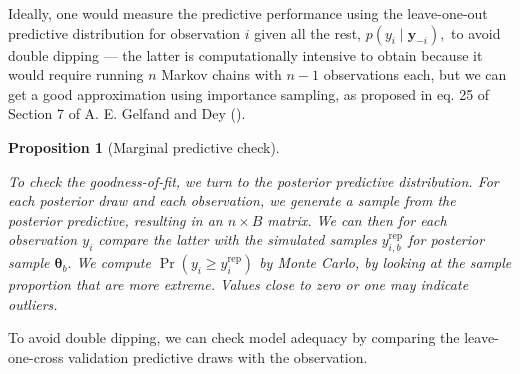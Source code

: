 \documentclass[
  11pt,
  letterpaper,
]{scrbook}
\theoremstyle{plain}
\theoremstyle{plain}
\newtheorem{proposition}{Proposition}[chapter]
\theoremstyle{definition}
\theoremstyle{definition}
\theoremstyle{definition}
\theoremstyle{plain}
\theoremstyle{remark}
\begin{document}
Ideally, one would measure the predictive performance using the
leave-one-out predictive distribution for observation \(i\) given all
the rest, \(p(y_i \mid \boldsymbol{y}_{-i}),\) to avoid double dipping
--- the latter is computationally intensive to obtain because it would
require running \(n\) Markov chains with \(n-1\) observations each, but
we can get a good approximation using importance sampling, as proposed
in eq. 25 of Section 7 of A. E. Gelfand and Dey
().

\begin{proposition}[Marginal predictive
check]\protect\hypertarget{prp-marginal-pred-checks}{}\label{prp-marginal-pred-checks}

To check the goodness-of-fit, we turn to the posterior predictive
distribution. For each posterior draw and each observation, we generate
a sample from the posterior predictive, resulting in an \(n \times B\)
matrix. We can then for each observation \(y_i\) compare the latter with
the simulated samples \(y_{i,b}^{\mathrm{rep}}\) for posterior sample
\(\boldsymbol{\theta}_b.\) We compute
\(\Pr(y_i \geq y_{i}^{\mathrm{rep}})\) by Monte Carlo, by looking at the
sample proportion that are more extreme. Values close to zero or one may
indicate outliers.

\end{proposition}

To avoid double dipping, we can check model adequacy by comparing the
leave-one-cross validation predictive draws with the observation.
\end{document}

